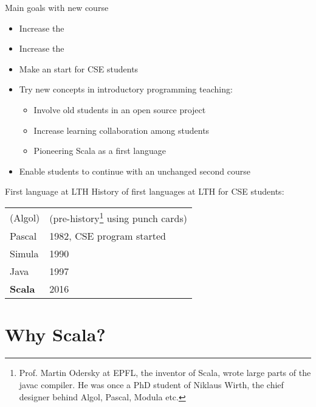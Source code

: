 \documentclass{lecturenotes}
\newcommand{\Section}[1]{\section{#1}\frame{\centering\huge\bfseries\textcolor{blue}{#1}}}
\begin{document}
\begin{Slide}{Main goals with new course}\small
\begin{itemize}
\item Increase the 
\item Increase the 
\item Make an  start for CSE students
\item Try new concepts in introductory programming teaching:
\begin{itemize}
\item Involve old students in an open source project
\item Increase learning collaboration among students
\item Pioneering Scala as a first language
\end{itemize}
\item Enable students to continue with an unchanged second course
\end{itemize}
\end{Slide}


\begin{Slide}{First language at LTH}%
History of first languages at LTH for CSE students:
\begin{table}
\begin{tabular}{l l}
(Algol) & (pre-history\footnote{Prof. Martin Odersky at EPFL, the inventor of Scala, wrote large parts of the javac compiler. He was once a PhD student of Niklaus Wirth, the chief designer behind Algol, Pascal, Modula etc.} using punch cards) \\
 Pascal & 1982, CSE program started\\
 Simula &  1990 \\
Java &  1997 \\
\textbf{Scala} &  2016 \\
\end{tabular}
\end{table}

\end{Slide}



\Section{Why Scala?}
\end{document}

